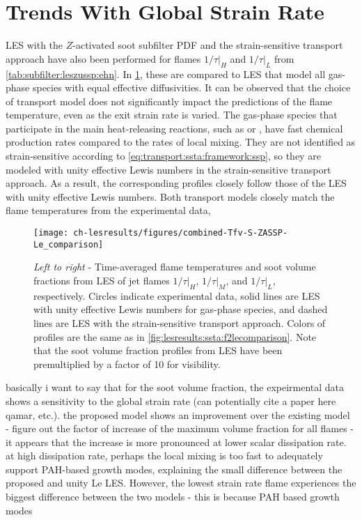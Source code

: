 \section{Trends With Global Strain Rate}
\label{sec:lesresults:strain}

LES with the $Z$-activated soot subfilter PDF and the strain-sensitive transport approach have also been performed for flames $1/\tau|_H$ and $1/\tau|_L$ from \cref{tab:subfilter:leszussp:ehn}. In \cref{fig:lesresults:strain:allflameslecomparison}, these are compared to LES that model all gas-phase species with equal effective diffusivities. It can be observed that the choice of transport model does not significantly impact the predictions of the flame temperature, even as the exit strain rate is varied. The gas-phase species that participate in the main heat-releasing reactions, such as  or , have fast chemical production rates compared to the rates of local mixing. They are not identified as strain-sensitive according to \cref{eq:transport:ssta:framework:ssp}, so they are modeled with unity effective Lewis numbers in the strain-sensitive transport approach. As a result, the corresponding profiles closely follow those of the LES with unity effective Lewis numbers. Both transport models closely match the flame temperatures from the experimental data, 
          

\begin{figure}[htb]
  \centering
  \texttt{[image: ch-lesresults/figures/combined-Tfv-S-ZASSP-Le\_comparison]}
  \caption[Centerline \texorpdfstring{$\langle T \rangle$}{<T>} \& \texorpdfstring{$\langle f_V \rangle$}{<fV>} from LES of Flames \texorpdfstring{$1/\tau|_H$}{1/t|H}, \texorpdfstring{$1/\tau|_M$}{1/t|M}, and \texorpdfstring{$1/\tau|_L$}{1/t|L} with Various Transport Approaches]{\textit{Left to right} - Time-averaged flame temperatures and soot volume fractions from LES of jet flames $1/\tau|_H$, $1/\tau|_M$, and $1/\tau|_L$, respectively. Circles indicate experimental data, solid lines are LES with unity effective Lewis numbers for gas-phase species, and dashed lines are LES with the strain-sensitive transport approach. Colors of profiles are the same as in \cref{fig:lesresults:ssta:f2lecomparison}. Note that the soot volume fraction profiles from LES have been premultiplied by a factor of 10 for visibility.}
  \label{fig:lesresults:strain:allflameslecomparison}
\end{figure}

basically i want to say that for the soot volume fraction, the expeirmental data shows a sensitivity to the global strain rate (can potentially cite a paper here qamar, etc.). the proposed model shows an improvement over the existing model - figure out the factor of increase of the maximum volume fraction for all flames - it appears that the increase is more pronounced at lower scalar dissipation rate. at high dissipation rate, perhaps the local mixing is too fast to adequately support PAH-based growth modes, explaining the small difference between the proposed and unity Le LES. However, the lowest strain rate flame experiences the biggest difference between the two models - this is because PAH based growth modes 

